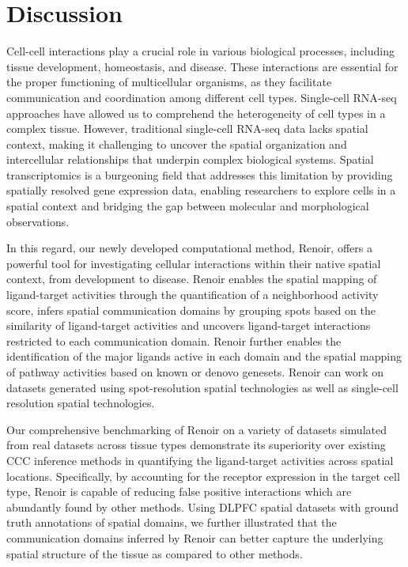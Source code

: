 \section*{Discussion}
Cell-cell interactions play a crucial role in various biological processes, including tissue development, homeostasis, and disease. These interactions are essential for the proper functioning of multicellular organisms, as they facilitate communication and coordination among different cell types. Single-cell RNA-seq approaches have allowed us to comprehend the heterogeneity of cell types in a complex tissue. However, traditional single-cell RNA-seq data lacks spatial context, making it challenging to uncover the spatial organization and intercellular relationships that underpin complex biological systems. Spatial transcriptomics is a burgeoning field that addresses this limitation by providing spatially resolved gene expression data, enabling researchers to explore cells in a spatial context and bridging the gap between molecular and morphological observations.\par
 
In this regard, our newly developed computational method, Renoir, offers a powerful tool for investigating cellular interactions within their native spatial context, from development to disease. Renoir enables the spatial mapping of ligand-target activities through the quantification of a neighborhood activity score, infers spatial communication domains by grouping spots based on the similarity of ligand-target activities and uncovers ligand-target interactions restricted to each communication domain. Renoir further enables the identification of the major ligands active in each domain and the spatial mapping of pathway activities based on known or denovo genesets. Renoir can work on datasets generated using spot-resolution spatial technologies as well as single-cell resolution spatial technologies. \par

Our comprehensive benchmarking of Renoir on a variety of datasets simulated from real datasets across tissue types demonstrate its superiority over existing CCC inference methods in quantifying the ligand-target activities across spatial locations. Specifically, by accounting for the receptor expression in the target cell type, Renoir is capable of reducing false positive interactions which are abundantly found by other methods. Using DLPFC spatial datasets with ground truth annotations of spatial domains, we further illustrated that the communication domains inferred by Renoir can better capture the underlying spatial structure of the tissue as compared to other methods. \par 

